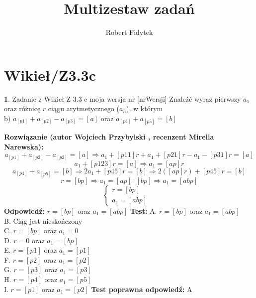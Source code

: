 \documentclass[12pt, a4paper]{article}
\title{Multizestaw zadań}
\author{Robert Fidytek}
\date{}
\theoremstyle{definition} %
\newtheorem{zad}{}
\newcommand{\kategoria}[1]{\section{#1}} %
\newcommand{\zadStart}[1]{\begin{zad}#1\newline} %
\newcommand{\zadStop}{\end{zad}}   %
\newcommand{\rozwStart}[2]{\noindent \textbf{Rozwiązanie (autor #1 , recenzent #2): }\newline} %
\newcommand{\rozwStop}{\newline}                                            %
\newcommand{\odpStart}{\noindent \textbf{Odpowiedź:}\newline}    %
\newcommand{\odpStop}{\newline}                                             %
\newcommand{\testStart}{\noindent \textbf{Test:}\newline} %
\newcommand{\testStop}{\newline} %
\newcommand{\kluczStart}{\noindent \textbf{Test poprawna odpowiedź:}\newline} %
\newcommand{\kluczStop}{\newline} %
\begin{document}
\maketitle


\kategoria{Wikieł/Z3.3c}
\zadStart{Zadanie z Wikieł Z 3.3 c moja wersja nr [nrWersji]}
Znaleźć wyraz pierwszy $a_{1}$ oraz różnicę $r$ ciągu arytmetycznego ($a_{n}$), w którym \\
b) $a_{[p1]}+a_{[p2]}-a_{[p3]}=[a]$ oraz $a_{[p4]}+ a_{[p5]}=[b]$
\zadStop
\rozwStart{Wojciech Przybylski}{Mirella Narewska}
$$a_{[p1]}+a_{[p2]}-a_{[p3]}=[a]\Rightarrow a_{1}+[p11]r+a_{1}+[p21]r-a_{1}-[p31]r=[a]$$
$$a_{1}+[p123]r=[a] \Rightarrow a_{1}=[ap]r$$
$$a_{[p4]}+ a_{[p5]}=[b] \Rightarrow 2a_{1}+[p45]r=[b] \Rightarrow 2([ap]r)+[p45]r=[b]$$
$$r=[bp] \Rightarrow a_{1}=[ap]\cdot [bp] \Rightarrow a_{1}=[abp] $$
$$
 \left\{ \begin{array}{ll}
r=[bp] & \\
a_{1}=[abp] &
\end{array} \right.
$$
\rozwStop
\odpStart
$r=[bp]$ oraz $a_{1}=[abp]$
\odpStop
\testStart
A. $r=[bp]$ oraz $a_{1}=[abp]$\\
B. Ciąg jest nieskończony\\
C. $r=[bp]$ oraz $a_{1}=0$\\
D. $r=0$ oraz $a_{1}=[bp]$\\
E. $r=[p1]$ oraz $a_{1}=[p1]$\\
F. $r=[p2]$ oraz $a_{1}=[p2]$\\
G. $r=[p3]$ oraz $a_{1}=[p3]$\\
H. $r=[p4]$ oraz $a_{1}=[p5]$\\
I. $r=[p1]$ oraz $a_{1}=[p2]$
\testStop
\kluczStart
A
\kluczStop
\end{document}
